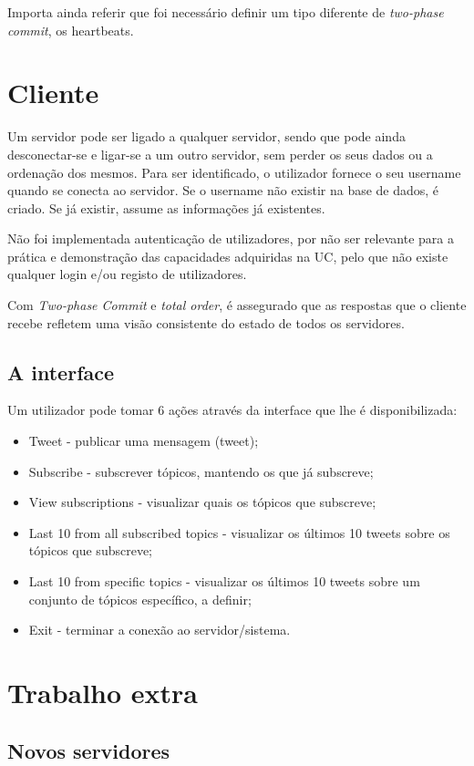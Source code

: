 \documentclass[a4paper]{report}
\begin{document}
		Importa ainda referir que foi necessário definir um tipo diferente de \textit{two-phase commit}, os heartbeats. %


	\section{Cliente}
		Um servidor pode ser ligado a qualquer servidor, sendo que pode ainda desconectar-se e ligar-se a um outro servidor, sem perder os seus dados ou a ordenação dos mesmos.
		Para ser identificado, o utilizador fornece o seu username quando se conecta ao servidor. Se o username não existir na base de dados, é criado. Se já existir, assume as informações já existentes.

		Não foi implementada autenticação de utilizadores, por não ser relevante para a prática e demonstração das capacidades adquiridas na UC, pelo que não existe qualquer login e/ou registo de utilizadores.

		Com \textit{Two-phase Commit} e \textit{total order}, é assegurado que as respostas que o cliente recebe refletem uma visão consistente do estado de todos os servidores.


		\subsection{A interface}
		Um utilizador pode tomar 6 ações através da interface que lhe é disponibilizada:
		\begin{itemize}
			\item Tweet - publicar uma mensagem (tweet);
			\item Subscribe - subscrever tópicos, mantendo os que já subscreve;
			\item View subscriptions - visualizar quais os tópicos que subscreve;
			\item Last 10 from all subscribed topics - visualizar os últimos 10 tweets sobre os tópicos que subscreve;
			\item Last 10 from specific topics - visualizar os últimos 10 tweets sobre um conjunto de tópicos específico, a definir;
			\item Exit - terminar a conexão ao servidor/sistema.
		\end{itemize}

	\section{Trabalho extra}
		\subsection{Novos servidores}
\end{document}
